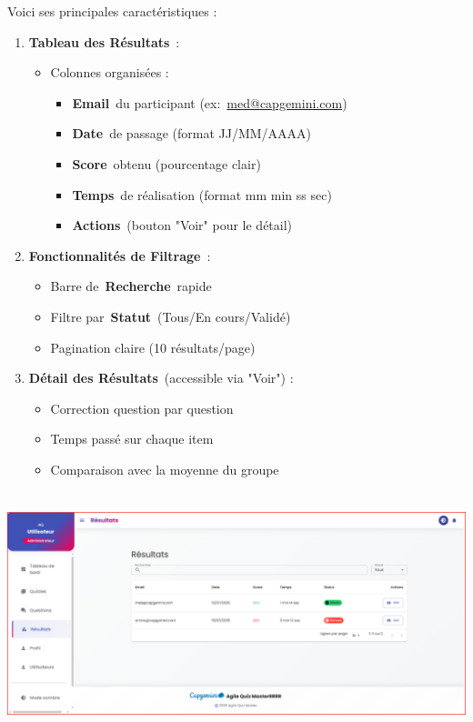 \documentclass[12pt,a4paper,twoside]{report}
\begin{document}
Voici ses principales caractéristiques :

\begin{enumerate}
\def\labelenumi{\arabic{enumi}.}
\item
  \textbf{Tableau des Résultats}~:

  \begin{itemize}
  \item
    Colonnes organisées :

    \begin{itemize}
    \item
      \textbf{Email}~du participant
      (ex:~\href{https://mailto:med@copgermini.com/}{med@capgemini.com})
    \item
      \textbf{Date}~de passage (format JJ/MM/AAAA)
    \item
      \textbf{Score}~obtenu (pourcentage clair)
    \item
      \textbf{Temps}~de réalisation (format mm min ss sec)
    \item
      \textbf{Actions}~(bouton "Voir" pour le détail)
    \end{itemize}
  \end{itemize}
\item
  \textbf{Fonctionnalités de Filtrage}~:

  \begin{itemize}
  \item
    Barre de~\textbf{Recherche}~rapide
  \item
    Filtre par~\textbf{Statut}~(Tous/En cours/Validé)
  \item
    Pagination claire (10 résultats/page)
  \end{itemize}
\item
  \textbf{Détail des Résultats}~(accessible via "Voir") :

  \begin{itemize}
  \item
    Correction question par question
  \item
    Temps passé sur chaque item
  \item
    Comparaison avec la moyenne du groupe
  \end{itemize}
\end{enumerate}

\includegraphics[width=6.3in,height=2.78681in]{latex_media/media/image64.png}
\end{document}
